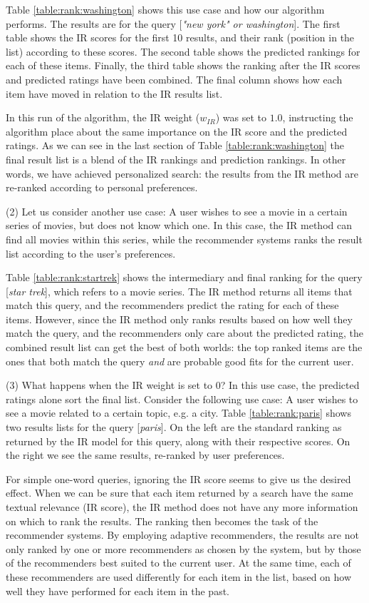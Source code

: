 Table \ref{table:rank:washington} shows this use case and how our algorithm performs.
The results are for the query [\emph{"new york" or washington}].
The first table shows the IR scores for the first 10 results,
and their rank (position in the list) according to these scores.
The second table shows the predicted rankings for each of these items.
Finally, the third table shows the ranking after the IR scores
and predicted ratings have been combined.
The final column shows how each item have moved in relation to the 
IR results list.

In this run of the algorithm, the IR weight ($w_{IR}$) was set to $1.0$,
instructing the algorithm place about the same importance on the IR score
and the predicted ratings. As we can see in the last section of 
Table \ref{table:rank:washington} the final result list is a blend
of the IR rankings and prediction rankings.
In other words, we have achieved personalized search: the results
from the IR method are re-ranked according to personal preferences.


(2) Let us consider another use case:
A user wishes to see a movie in a certain series of movies,
but does not know which one. In this case, the IR method can find all movies within this series,
while the recommender systems ranks the result list according to the user's preferences.

Table \ref{table:rank:startrek} shows the intermediary and final ranking
for the query [\emph{star trek}], which refers to a movie series.
The IR method returns all items that match this query,
and the recommenders predict the rating for each of these items.
However, since the IR method only ranks results based on how well they match the query,
and the recommenders only care about the predicted rating, the combined result
list can get the best of both worlds:
the top ranked items are the ones that both match the query \emph{and}
are probable good fits for the current user.

(3) What happens when the IR weight is set to $0$?
In this use case, the predicted ratings alone sort the final list.
Consider the following use case:
A user wishes to see a movie related to a certain topic, e.g. a city.
Table \ref{table:rank:paris} shows two results lists for the query [\emph{paris}].
On the left are the standard ranking as returned by the IR model for this query,
along with their respective scores.
On the right we see the same results, re-ranked by user preferences.

For simple one-word queries, ignoring the IR score seems to give us the desired effect.
When we can be sure that each item returned by a search have the same textual relevance
(IR score), the IR method does not have any more information on which to rank
the results. The ranking then becomes the task of the recommender systems.
By employing adaptive recommenders, the results are not only ranked by 
one or more recommenders as chosen by the system, but by those of the recommenders
best suited to the current user. At the same time, each of these recommenders
are used differently for each item in the list, based on how well they have
performed for each item in the past.

